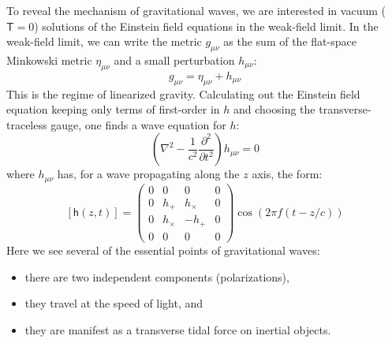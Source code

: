 To reveal the mechanism of gravitational waves, we are interested in
vacuum ($\mathsf{T}=0$) solutions of the Einstein field equations in
the weak-field limit.  In the weak-field limit, we can write the
metric $g_{\mu\nu}$ as the sum of the flat-space Minkowski metric
$\eta_{\mu\nu}$ and a small perturbation $h_{\mu\nu}$:
$$g_{\mu\nu} = \eta_{\mu\nu} + h_{\mu\nu}$$ This is the regime of
linearized gravity.  Calculating out the Einstein field equation
keeping only terms of first-order in $h$ and choosing the
transverse-traceless gauge, one finds\cite{Carroll1997Lecture} a wave
equation for $h$:
$$\left(\nabla^2 - \frac{1}{c^2}\frac{\partial^2}{\partial t^2}\right)h_{\mu\nu} = 0$$
where $h_{\mu\nu}$ has, for a wave propagating along the $z$ axis, the form:
$$ [\mathsf{h}(z,t)] = \left(
\begin{array}{cccc}
0 & 0       &  0      & 0 \\
0 & h_+     &  h_\times & 0 \\
0 & h_\times & -h_+     & 0 \\ 
0 & 0       &  0      & 0 
\end{array}
 \right) \cos\left(2\pi f (t - z/c)\right)
$$
Here we see several of the essential points of gravitational waves:
\begin{itemize}
\item there are two independent components (polarizations),
\item they travel at the speed of light, and
\item they are manifest as a transverse tidal force on inertial objects.
\end{itemize}

